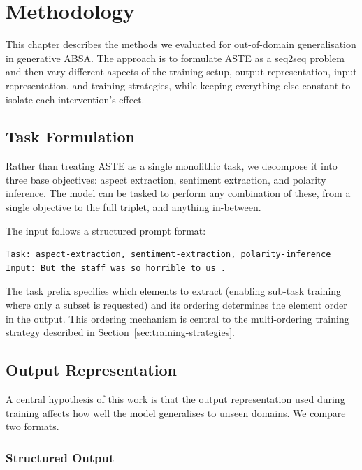 \documentclass[12pt,a4paper]{report}
\begin{document}
\chapter{Methodology}\label{ch:metodology}

This chapter describes the methods we evaluated for out-of-domain generalisation in generative ABSA. The approach is to formulate ASTE as a seq2seq problem and then vary different aspects of the training setup, output representation, input representation, and training strategies, while keeping everything else constant to isolate each intervention's effect.

\section{Task Formulation}

Rather than treating ASTE as a single monolithic task, we decompose it into three base objectives: aspect extraction, sentiment extraction, and polarity inference. The model can be tasked to perform any combination of these, from a single objective to the full triplet, and anything in-between.

The input follows a structured prompt format:

\begin{lstlisting}
Task: aspect-extraction, sentiment-extraction, polarity-inference
Input: But the staff was so horrible to us .
\end{lstlisting}

The task prefix specifies which elements to extract (enabling sub-task training where only a subset is requested) and its ordering determines the element order in the output. This ordering mechanism is central to the multi-ordering training strategy described in Section~\ref{sec:training-strategies}.


\section{Output Representation}\label{sec:output-format}

A central hypothesis of this work is that the output representation used during training affects how well the model generalises to unseen domains. We compare two formats.

\subsection{Structured Output}
\end{document}
